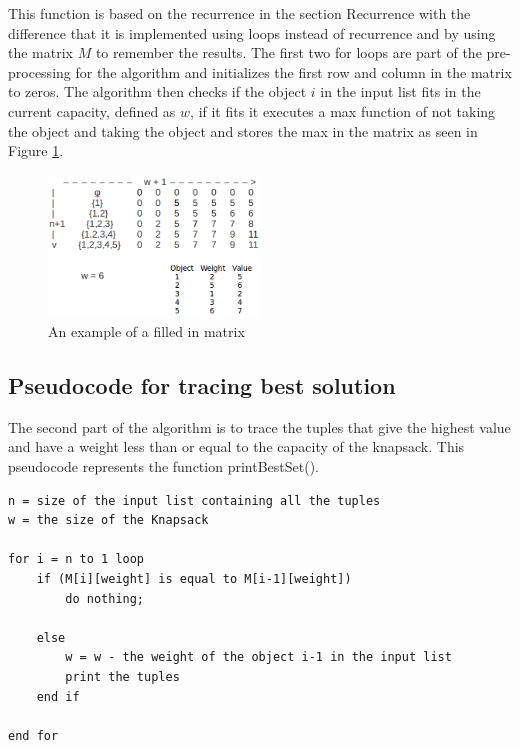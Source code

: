 \documentclass{inc/mas}
\begin{document}
This function is based on the recurrence in the section Recurrence with the difference that it is implemented using loops instead of recurrence and by using the matrix $M$ to remember the results. The first two for loops are part of the pre-processing for the algorithm and initializes the first row and column in the matrix to zeros. The algorithm then checks if the object $i$ in the input list fits in the current capacity, defined as $w$, if it fits it executes a max function of not taking the object and taking the object and stores the max in the matrix as seen in Figure \ref{unmarked_matrix}. 

\begin{figure}[h!]
  \centering
      \includegraphics[width=0.5\textwidth]{unmarked_matrix.png}
  \caption{An example of a filled in matrix}
\label{unmarked_matrix}
\end{figure}

\subsection{Pseudocode for tracing best solution}

The second part of the algorithm is to trace the tuples that give the highest value and have a weight less than or equal to the capacity of the knapsack. This pseudocode represents the function printBestSet(). \\ 

\begin{lstlisting}
n = size of the input list containing all the tuples
w = the size of the Knapsack 

for i = n to 1 loop
	if (M[i][weight] is equal to M[i-1][weight])
		do nothing;
	
	else
		w = w - the weight of the object i-1 in the input list
		print the tuples
	end if 
	
end for
\end{lstlisting}
\end{document}
